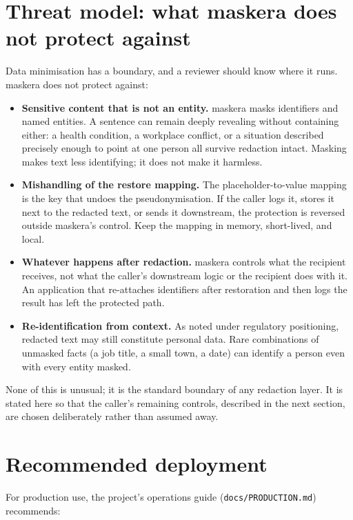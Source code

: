 \documentclass[10pt,a4paper]{article}
\newcommand{\pkg}[1]{\texttt{#1}}
\begin{document}
\section{Threat model: what maskera does not protect against}

Data minimisation has a boundary, and a reviewer should know where it runs.
maskera does not protect against:

\begin{itemize}
  \item \textbf{Sensitive content that is not an entity.} maskera masks
        identifiers and named entities. A sentence can remain deeply
        revealing without containing either: a health condition, a workplace
        conflict, or a situation described precisely enough to point at one
        person all survive redaction intact. Masking makes text less
        identifying; it does not make it harmless.
  \item \textbf{Mishandling of the restore mapping.} The
        placeholder-to-value mapping is the key that undoes the
        pseudonymisation. If the caller logs it, stores it next to the
        redacted text, or sends it downstream, the protection is reversed
        outside maskera's control. Keep the mapping in memory, short-lived,
        and local.
  \item \textbf{Whatever happens after redaction.} maskera controls what the
        recipient receives, not what the caller's downstream logic or the
        recipient does with it. An application that re-attaches identifiers
        after restoration and then logs the result has left the protected
        path.
  \item \textbf{Re-identification from context.} As noted under regulatory
        positioning, redacted text may still constitute personal data. Rare
        combinations of unmasked facts (a job title, a small town, a date)
        can identify a person even with every entity masked.
\end{itemize}

None of this is unusual; it is the standard boundary of any redaction layer.
It is stated here so that the caller's remaining controls, described in the
next section, are chosen deliberately rather than assumed away.

\section{Recommended deployment}

For production use, the project's operations guide
(\pkg{docs/PRODUCTION.md}) recommends:
\end{document}

